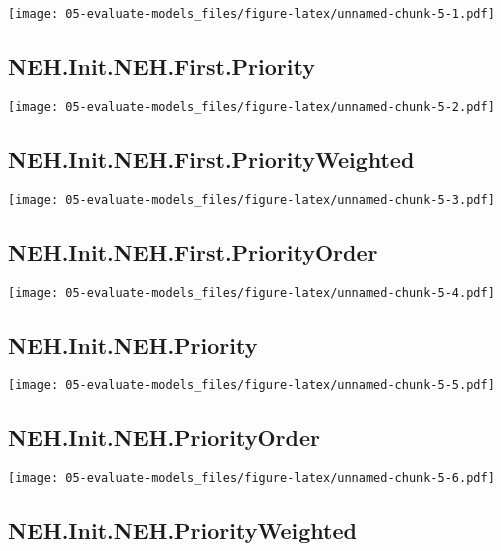 \documentclass[
]{article}
\begin{document}
\texttt{[image: 05-evaluate-models\_files/figure-latex/unnamed-chunk-5-1.pdf]}

\hypertarget{neh.init.neh.first.priority}{%
\subsection{NEH.Init.NEH.First.Priority}\label{neh.init.neh.first.priority}}

\texttt{[image: 05-evaluate-models\_files/figure-latex/unnamed-chunk-5-2.pdf]}

\hypertarget{neh.init.neh.first.priorityweighted}{%
\subsection{NEH.Init.NEH.First.PriorityWeighted}\label{neh.init.neh.first.priorityweighted}}

\texttt{[image: 05-evaluate-models\_files/figure-latex/unnamed-chunk-5-3.pdf]}

\hypertarget{neh.init.neh.first.priorityorder}{%
\subsection{NEH.Init.NEH.First.PriorityOrder}\label{neh.init.neh.first.priorityorder}}

\texttt{[image: 05-evaluate-models\_files/figure-latex/unnamed-chunk-5-4.pdf]}

\hypertarget{neh.init.neh.priority}{%
\subsection{NEH.Init.NEH.Priority}\label{neh.init.neh.priority}}

\texttt{[image: 05-evaluate-models\_files/figure-latex/unnamed-chunk-5-5.pdf]}

\hypertarget{neh.init.neh.priorityorder}{%
\subsection{NEH.Init.NEH.PriorityOrder}\label{neh.init.neh.priorityorder}}

\texttt{[image: 05-evaluate-models\_files/figure-latex/unnamed-chunk-5-6.pdf]}

\hypertarget{neh.init.neh.priorityweighted}{%
\subsection{NEH.Init.NEH.PriorityWeighted}\label{neh.init.neh.priorityweighted}}
\end{document}
